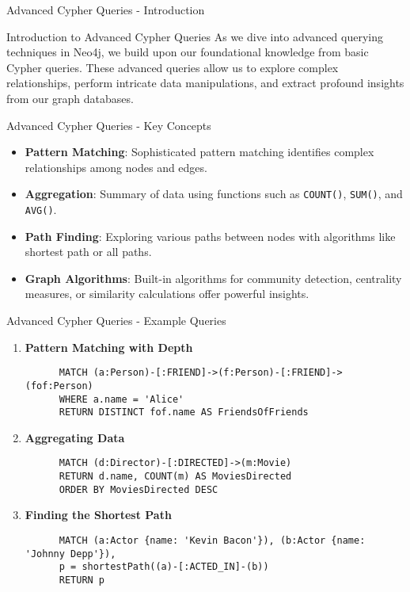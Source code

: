 \documentclass[aspectratio=169]{beamer}
\begin{document}
\begin{frame}[fragile]{Advanced Cypher Queries - Introduction}
  \begin{block}{Introduction to Advanced Cypher Queries}
    As we dive into advanced querying techniques in Neo4j, we build upon our foundational knowledge from basic Cypher queries. 
    These advanced queries allow us to explore complex relationships, perform intricate data manipulations, and extract profound insights from our graph databases.
  \end{block}
\end{frame}

\begin{frame}[fragile]{Advanced Cypher Queries - Key Concepts}
  \begin{itemize}
    \item \textbf{Pattern Matching}: Sophisticated pattern matching identifies complex relationships among nodes and edges.
    \item \textbf{Aggregation}: Summary of data using functions such as \texttt{COUNT()}, \texttt{SUM()}, and \texttt{AVG()}.
    \item \textbf{Path Finding}: Exploring various paths between nodes with algorithms like shortest path or all paths.
    \item \textbf{Graph Algorithms}: Built-in algorithms for community detection, centrality measures, or similarity calculations offer powerful insights.
  \end{itemize}
\end{frame}

\begin{frame}[fragile]{Advanced Cypher Queries - Example Queries}
  \begin{enumerate}
    \item \textbf{Pattern Matching with Depth}
      \begin{lstlisting}
      MATCH (a:Person)-[:FRIEND]->(f:Person)-[:FRIEND]->(fof:Person)
      WHERE a.name = 'Alice'
      RETURN DISTINCT fof.name AS FriendsOfFriends
      \end{lstlisting}

    \item \textbf{Aggregating Data}
      \begin{lstlisting}
      MATCH (d:Director)-[:DIRECTED]->(m:Movie)
      RETURN d.name, COUNT(m) AS MoviesDirected
      ORDER BY MoviesDirected DESC
      \end{lstlisting}

    \item \textbf{Finding the Shortest Path}
      \begin{lstlisting}
      MATCH (a:Actor {name: 'Kevin Bacon'}), (b:Actor {name: 'Johnny Depp'}),
      p = shortestPath((a)-[:ACTED_IN]-(b))
      RETURN p
      \end{lstlisting}
  \end{enumerate}
\end{frame}
\end{document}
